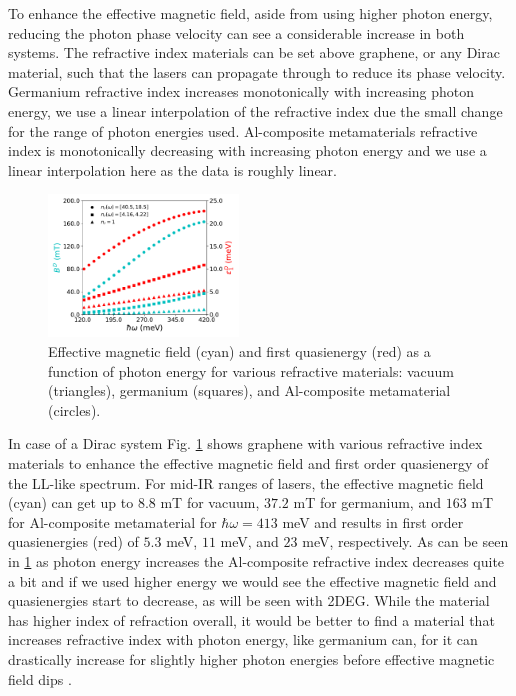 \documentclass[aps,prb,twocolumn,showpacs,superscriptaddress]{revtex4-2}
\begin{document}
To enhance the effective magnetic field, aside from using higher photon energy, reducing the photon phase velocity can see a considerable increase in both systems.
The refractive index materials can be set above graphene, or any Dirac material, such that the lasers can propagate through to reduce its phase velocity.
Germanium refractive index increases monotonically with increasing photon energy, we use a linear interpolation of the refractive index due the small change for the range of photon energies used.
Al-composite metamaterials refractive index is monotonically decreasing with increasing photon energy and we use a linear interpolation here as the data is roughly linear.

\begin{figure}[h]
  \includegraphics[width=0.45\textwidth]{./figures/dirac-eff-bfield-energy.pdf}
  \caption{Effective magnetic field (cyan) and first quasienergy (red) as a function of photon energy for various refractive materials: vacuum (triangles), germanium (squares), and  Al-composite metamaterial (circles).}
  \label{fig:dirac-bfield-energy}
\end{figure}

In case of a Dirac system Fig. \ref{fig:dirac-bfield-energy} shows graphene with various refractive index materials to enhance the effective magnetic field and first order quasienergy of the LL-like spectrum.
For mid-IR ranges of lasers, the effective magnetic field (cyan) can get up to $8.8$ mT for vacuum, $37.2$ mT for germanium, and $163$ mT for Al-composite metamaterial for $\hbar\omega=413$ meV and results in first order quasienergies (red) of $5.3$ meV, $11$ meV, and $23$ meV, respectively.
As can be seen in \ref{fig:dirac-bfield-energy} as photon energy increases the Al-composite refractive index decreases quite a bit and if we used higher energy we would see the effective magnetic field and quasienergies start to decrease, as will be seen with 2DEG.
While the material has higher index of refraction overall, it would be better to find a material that increases refractive index with photon energy, like germanium can, for it can drastically increase for slightly higher photon energies before effective magnetic field dips \cite{amotchkinaCharacterizationEbeamEvaporated2020}.
\end{document}
